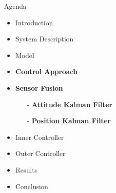\begin{frame}{Agenda}{}
    \begin{itemize}
        \item Introduction
        \item System Description
        \item Model
        \item \textbf{Control Approach}
        \item \textbf{Sensor Fusion}
        \begin{itemize}
            \item[-] \textbf{Attitude Kalman Filter}
            \item[-] \textbf{Position Kalman Filter}
        \end{itemize}
        \item Inner Controller
        \item Outer Controller
        \item Results
        \item Conclusion
    \end{itemize}
\end{frame}